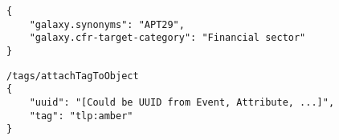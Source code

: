 \documentclass{article}
\begin{document}
\newsavebox\codeboxE
\begin{lrbox}{\codeboxE}
    \begin{minipage}{0.46\textwidth}
    \lstset{style=js}
    \begin{lstlisting}
{
    "galaxy.synonyms": "APT29",
    "galaxy.cfr-target-category": "Financial sector"
}\end{lstlisting}
    \end{minipage}
\end{lrbox}

\newsavebox\codeboxF
\begin{lrbox}{\codeboxF}
    \begin{minipage}{0.46\textwidth}
    \lstset{style=js}
    \begin{lstlisting}
/tags/attachTagToObject
{
    "uuid": "[Could be UUID from Event, Attribute, ...]",
    "tag": "tlp:amber"
}\end{lstlisting}
    \end{minipage}
\end{lrbox}
\end{document}
